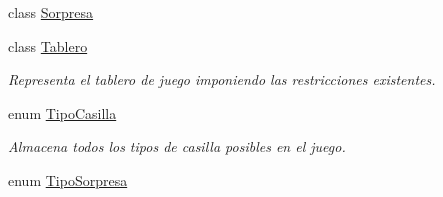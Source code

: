 \begin{DoxyCompactItemize}
class \hyperlink{classcivitas_1_1Sorpresa}{Sorpresa}
\item 
class \hyperlink{classcivitas_1_1Tablero}{Tablero}
\begin{DoxyCompactList}\small\item\em Representa el tablero de juego imponiendo las restricciones existentes. \end{DoxyCompactList}\item 
enum \hyperlink{enumcivitas_1_1TipoCasilla}{Tipo\+Casilla}
\begin{DoxyCompactList}\small\item\em Almacena todos los tipos de casilla posibles en el juego. \end{DoxyCompactList}\item 
enum \hyperlink{enumcivitas_1_1TipoSorpresa}{Tipo\+Sorpresa}
\end{DoxyCompactItemize}
